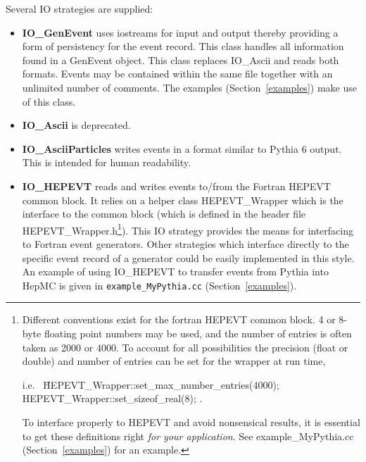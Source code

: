 \documentclass[11pt,letterpaper]{article}
\begin{document}
Several IO strategies are supplied:
\begin{itemize}\setlength{\itemsep}{0pt}
  \item {\bf IO\_GenEvent} uses iostreams for input and output
    thereby providing a form of persistency for the event record. 
    This class handles all information found in a GenEvent object.
    This class replaces IO\_Ascii and reads both formats.
    Events may be contained within the same file together with
    an unlimited number of comments. 
    The examples (Section~\ref{examples}) make use of this class.
  \item {\bf IO\_Ascii} is deprecated.
  \item {\bf IO\_AsciiParticles} writes events in a format similar to 
     Pythia 6 output.  This is intended for human readability.
  \item {\bf IO\_HEPEVT} reads and writes events to/from the Fortran HEPEVT
    common block. It relies on a helper class HEPEVT\_Wrapper which
    is the interface to the common block
    (which is defined in the header file HEPEVT\_Wrapper.h\footnote{
      Different conventions exist for the fortran HEPEVT common
      block. 4 or 8-byte floating point numbers may be used, and the
      number of entries is often taken as 2000 or 4000. To account for
      all possibilities the precision (float or double) and number of
      entries can be set for the wrapper at run time,
      \begin{tabbing}
      i.e.\ \hspace{1cm} \= HEPEVT\_Wrapper::set\_max\_number\_entries(4000);\\
                         \> HEPEVT\_Wrapper::set\_sizeof\_real(8); 
            \hspace{1cm} .
      \end{tabbing}
      To interface properly to HEPEVT and avoid nonsensical
      results, it is essential to get these definitions right
      {\it for your application}. See example\_MyPythia.cc
      (Section~\ref{examples}) for an example.
      }).
    This IO strategy
    provides the means for interfacing to Fortran event
    generators. Other strategies which interface directly to the
    specific event record of a generator could be easily implemented
    in this style. An example of using IO\_HEPEVT to transfer events
    from Pythia into HepMC is given in \verb!example_MyPythia.cc! 
    (Section~\ref{examples}).
\end{itemize}

%
%
\end{document}
